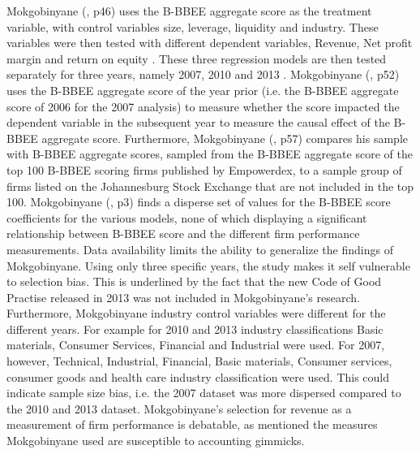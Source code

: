 Mokgobinyane (\citeyear{N4}, p46) uses the B-BBEE aggregate score as the treatment variable, with control variables size, leverage, liquidity and industry. These variables were then tested with different dependent variables, Revenue, Net profit margin and return on equity \cite[p48-49]{N24}. These three regression models are then tested separately for three years, namely 2007, 2010 and 2013 \cite[p53]{N24}.  Mokgobinyane (\citeyear{N4}, p52)  uses the B-BBEE aggregate score of the year prior (i.e. the B-BBEE aggregate score of 2006 for the 2007 analysis) to measure whether the score impacted the dependent variable in the subsequent year to measure the causal effect of the B-BBEE aggregate score. Furthermore, Mokgobinyane (\citeyear{N4}, p57)  compares his sample with B-BBEE aggregate scores, sampled from the B-BBEE aggregate score of the top 100 B-BBEE scoring firms published by Empowerdex, to a sample group of firms listed on the Johannesburg Stock Exchange that are not included in the top 100. Mokgobinyane (\citeyear{N4}, p3) finds a disperse set of values for the B-BBEE score coefficients for the various models, none of which displaying a significant relationship between B-BBEE score and the different firm performance measurements. Data availability limits the ability to generalize the findings of Mokgobinyane. Using only three specific years, the study makes it self vulnerable to selection bias. This is underlined by the fact that the new Code of Good Practise released in 2013 was not included in Mokgobinyane’s research. Furthermore, Mokgobinyane industry control variables were different for the different years. For example for 2010 and 2013 industry classifications Basic materials, Consumer Services, Financial and Industrial were used. For 2007, however, Technical, Industrial, Financial, Basic materials, Consumer services, consumer goods and health care industry classification were used. This could indicate sample size bias, i.e. the 2007 dataset was more dispersed compared to the 2010 and 2013 dataset. Mokgobinyane’s selection for revenue as a measurement of firm performance is debatable, as mentioned the measures Mokgobinyane used are susceptible to accounting gimmicks.

